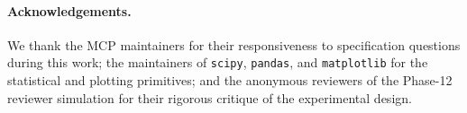\paragraph{Acknowledgements.}
We thank the MCP maintainers for their responsiveness to
specification questions during this work; the maintainers of
\texttt{scipy}, \texttt{pandas}, and \texttt{matplotlib} for
the statistical and plotting primitives; and the anonymous
reviewers of the Phase-12 reviewer simulation for their
rigorous critique of the experimental design.